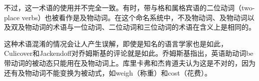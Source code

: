 不过，这一术语的使用并不完全一致。有时，带与格和属格宾语的二位动词（two-place verbs）也被看作是及物动词。在这个命名系统中，不及物动词、及物动词以及双及物动词的术语与一位动词、二位动词和三位动词的术语在含义上是相同的。

这种术语混淆的情况会让人产生误解，即使是知名的语言学家也是如此，Culicover和Jackendoff\citeyearpar[]{CJ2005a}对乔姆斯基的评论就是如此。乔姆斯基指出，英语助动词be带动词的被动态只能用在及物动词上。库里卡弗和杰肯道夫认为这是不对的，因为还有及物动词不能变换为被动式，如weigh（称重）和cost（花费）。 
\eal
{}
\zl

